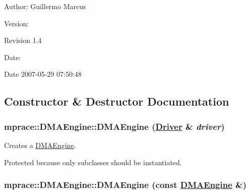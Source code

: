 \begin{Desc}
\item[Author:]Guillermo Marcus \end{Desc}
\begin{Desc}
\item[Version:]\begin{Desc}
\item[Revision]1.4 \end{Desc}
\end{Desc}
\begin{Desc}
\item[Date:]\begin{Desc}
\item[Date]2007-05-29 07:50:48 \end{Desc}
\end{Desc}




\subsection{Constructor \& Destructor Documentation}
\hypertarget{classmprace_1_1DMAEngine_b0}{
\subsubsection[DMAEngine]{\setlength{\rightskip}{0pt plus 5cm}mprace::DMAEngine::DMAEngine (\hyperlink{classmprace_1_1Driver}{Driver} \& {\em driver})}}
\label{classmprace_1_1DMAEngine_b0}


Creates a \hyperlink{classmprace_1_1DMAEngine}{DMAEngine}. 

Protected because only subclasses should be instantiated.\hypertarget{classmprace_1_1DMAEngine_b1}{
\subsubsection[DMAEngine]{\setlength{\rightskip}{0pt plus 5cm}mprace::DMAEngine::DMAEngine (const \hyperlink{classmprace_1_1DMAEngine}{DMAEngine} \&)}}
\label{classmprace_1_1DMAEngine_b1}


